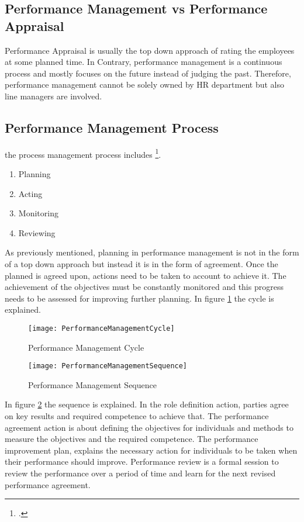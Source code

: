 \subsection{Performance Management vs Performance Appraisal}
Performance Appraisal is usually the top down approach of rating the employees at some planned time. In Contrary, performance management is a continuous process and mostly focuses on the future instead of judging the past. Therefore, performance management cannot be solely owned by \ac{HR} department but also line managers are involved.
\subsection{Performance Management Process}
the process management process includes \footcite[See][]{Armstrong2006}. 
\begin{enumerate}
\item Planning
\item Acting
\item Monitoring
\item Reviewing
\end{enumerate}
As previously mentioned, planning in performance management is not in the form of a top down approach but instead it is in the form of agreement. Once the planned is agreed upon, actions need to be taken to account to achieve it. The achievement of the objectives must be constantly monitored and this progress needs to be assessed for improving further planning.
In figure \ref{fig:PerformanceManagementCycle} the cycle is explained.
\begin{figure}
\caption{Performance Management Cycle}
\label{fig:PerformanceManagementCycle}
\texttt{[image: PerformanceManagementCycle]}
\\
\cite[Source: See][]{Armstrong2006}
\end{figure}

\begin{figure}
\caption{Performance Management Sequence}
\label{fig:PerformanceManagementSequence}
\texttt{[image: PerformanceManagementSequence]}
\\
\cite[Source: See][]{Armstrong2006}
\end{figure}

In figure \ref{fig:PerformanceManagementSequence} the sequence is explained. In the role definition action, parties agree on key results and required competence to achieve that. The performance agreement action is about defining the objectives for individuals and methods to measure the objectives and the required competence. The performance improvement plan, explains the necessary action for individuals to be taken when their performance should improve. Performance review is a formal session to review the performance over a period of time and learn for the next revised performance agreement.

